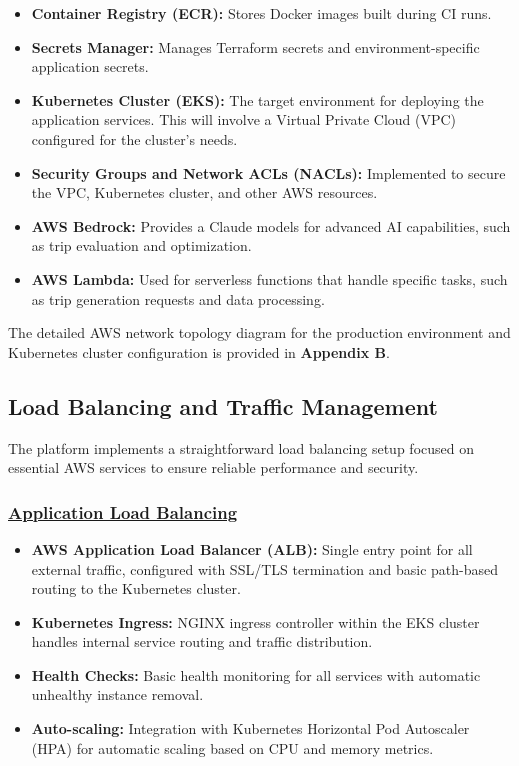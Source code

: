 \begin{itemize}
    \item \textbf{Container Registry (ECR):} Stores Docker images built during CI runs.
    \item \textbf{Secrets Manager:} Manages Terraform secrets and environment-specific application secrets.
    \item \textbf{Kubernetes Cluster (EKS):} The target environment for deploying the application services. This will involve a Virtual Private Cloud (VPC) configured for the cluster's needs.
    \item \textbf{Security Groups and Network ACLs (NACLs):} Implemented to secure the VPC, Kubernetes cluster, and other AWS resources.
    \item \textbf{AWS Bedrock:} Provides a Claude models for advanced AI capabilities, such as trip evaluation and optimization.
    \item \textbf{AWS Lambda:} Used for serverless functions that handle specific tasks, such as trip generation requests and data processing.
\end{itemize}

The detailed AWS network topology diagram for the production environment and Kubernetes cluster configuration is provided in \textbf{Appendix B}.

\subsection{Load Balancing and Traffic Management}
The platform implements a straightforward load balancing setup focused on essential AWS services to ensure reliable performance and security.

\subsubsection*{\underline{Application Load Balancing}}
\begin{itemize}
    \item \textbf{AWS Application Load Balancer (ALB):} Single entry point for all external traffic, configured with SSL/TLS termination and basic path-based routing to the Kubernetes cluster.
    \item \textbf{Kubernetes Ingress:} NGINX ingress controller within the EKS cluster handles internal service routing and traffic distribution.
    \item \textbf{Health Checks:} Basic health monitoring for all services with automatic unhealthy instance removal.
    \item \textbf{Auto-scaling:} Integration with Kubernetes Horizontal Pod Autoscaler (HPA) for automatic scaling based on CPU and memory metrics.
\end{itemize}

